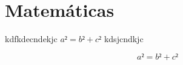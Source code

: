 \documentclass[a4paper,12pt]{article} %
\begin{document}


\section{Matemáticas}
kdfkdecndekjc $a²=b²+c²$  kdsjcndkjc

\[
a²=b²+c²
\]










\end{document}
